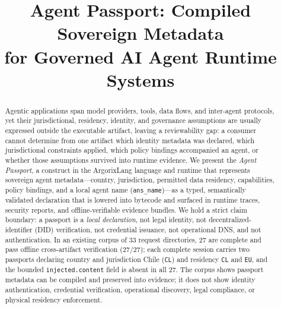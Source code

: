 \documentclass[conference]{IEEEtran}
\newcommand{\code}[1]{\texttt{\small #1}}
\newcommand{\Argorix}{%
\textcolor{argViolet}{A}\textcolor{argViolet}{r}\textcolor{argIndigo}{g}\textcolor{argIndigo}{o}\textcolor{argElectric}{r}\textcolor{argElectric}{i}\textcolor{argElectric}{x}\textcolor{argCyan}{L}\textcolor{argCyan}{a}\textcolor{argCyanBright}{n}\textcolor{argCyanBright}{g}\xspace}
\begin{document}
\title{Agent Passport: Compiled Sovereign Metadata\\for Governed AI Agent Runtime Systems}

\author{
}

\maketitle

\begin{abstract}
Agentic applications span model providers, tools, data flows, and inter-agent
protocols, yet their jurisdictional, residency, identity, and governance
assumptions are usually expressed outside the executable artifact, leaving a
reviewability gap: a consumer cannot determine from one artifact which identity
metadata was declared, which jurisdictional constraints applied, which policy
bindings accompanied an agent, or whether those assumptions survived into runtime
evidence. We present the \emph{Agent Passport}, a construct in the \Argorix
language and runtime that represents sovereign agent metadata---country,
jurisdiction, permitted data residency, capabilities, policy bindings, and a
local agent name (\code{ans\_name})---as a typed, semantically validated
declaration that is lowered into bytecode and surfaced in runtime traces,
security reports, and offline-verifiable evidence bundles. We hold a strict claim
boundary: a passport is a \emph{local declaration}, not legal identity, not
decentralized-identifier (DID) verification, not credential issuance, not
operational DNS, and not authentication. In an existing corpus of 33 request
directories, 27 are complete and pass offline cross-artifact verification
(27/27); each complete session carries two passports declaring country and
jurisdiction Chile (\code{CL}) and residency \code{CL} and \code{EU}, and the
bounded \code{injected.content} field is absent in all 27. The corpus shows
passport metadata can be compiled and preserved into evidence; it does not show
identity authentication, credential verification, operational discovery, legal
compliance, or physical residency enforcement.
\end{abstract}
\end{document}

